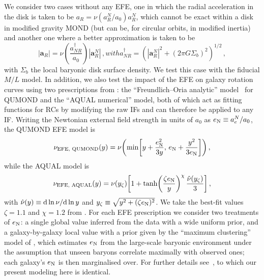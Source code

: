 \documentclass[reprint,nofootinbib,prd,aps]{revtex4-2}
\begin{document}
We consider two cases without any EFE, one in which the radial acceleration in the disk is taken to be $a_R = \nu({a^N_R/a_0})a^N_R$, which cannot be exact within a disk in modified gravity MOND (but can be, for circular orbits, in modified inertia) and another one where a better approximation is taken to be \cite{Brada:1995,FamaeyDura}
\begin{subequations}\label{eq:eN_Sigma}
\begin{equation}\label{eq:nu_eN}
    \left|\bm a_R\right| = \nu\left(\frac{a^\dagger_{NR}}{a_0}\right) \left|\bm a_{R}^N\right|\, , 
\end{equation}
with 
\begin{equation}
    a^\dagger_{NR} = \left(\left|\bm a_{R}^N\right|^2 + \left(2\pi G \Sigma_b\right)^2\right)^{1/2}\, ,
\end{equation}
\end{subequations}
with $\Sigma_b$ the local baryonic disk surface density. We test this case with the fiducial $M/L$ model. In addition, we also test the impact of the EFE on galaxy rotation curves using two prescriptions from \cite{chae:2022tt}: the ``Freundlich--Oria analytic'' model~\citep{Freundlich,Oria} for QUMOND and the ``AQUAL numerical'' model, both of which act as fitting functions for RCs by modifying the raw IFs and can therefore be applied to any IF. Writing the Newtonian external field strength in units of $a_0$ as $e_{\rm N} \equiv a^N_e/a_0$, the QUMOND EFE model is
\begin{equation}\label{eq:efe_fo}
\nu_\text{EFE, QUMOND}(y)=\nu\!\left({\rm min}\!\left[y+\frac{e_{\rm N}^2}{3y},\,e_{\rm N}+\frac{y^2}{3e_{\rm N}}\right]\right),
\end{equation}
while the AQUAL model is
\begin{equation}\label{eq:efe_an}
\nu_\text{EFE, AQUAL}(y)=\nu(y_\zeta)\!\left[1+\tanh\!\left(\frac{\zeta e_{\rm N}}{y}\right)^{\chi}\frac{\hat{\nu}(y_\zeta)}{3}\right],
\end{equation}
with $\hat{\nu}(y)\equiv{\rm d}\ln\nu/{\rm d}\ln y$ and $y_\zeta\equiv\sqrt{y^2+(\zeta e_{\rm N})^2}$. We take the best-fit values $\zeta=1.1$ and $\chi=1.2$ from \cite{chae:2022tt}. For each EFE prescription we consider two treatments of $e_{\rm N}$: a single global value inferred from the data with a wide uniform prior, and a galaxy-by-galaxy local value with a prior given by the ``maximum clustering'' model of \cite{Chae_2}, which estimates $e_{\rm N}$ from the large-scale baryonic environment under the assumption that unseen baryons correlate maximally with observed ones; each galaxy’s $e_{\rm N}$ is then marginalised over. For further details see~\cite{Desmond_Cassini}, to which our present modeling here is identical.
\end{document}
